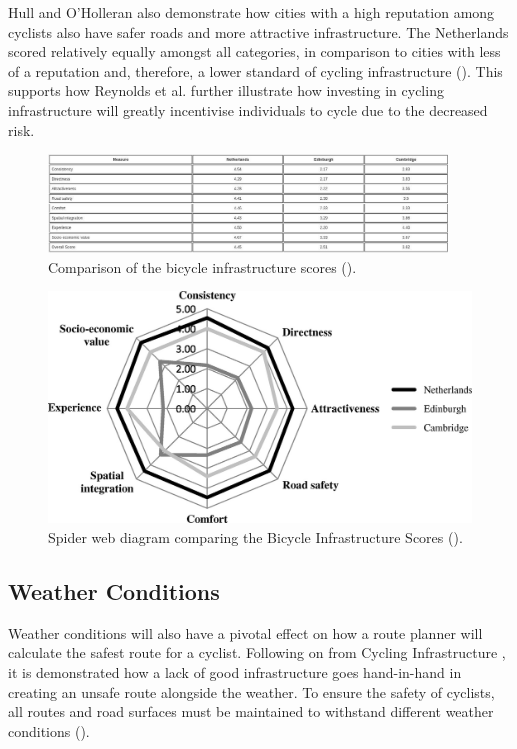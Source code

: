 Hull and O'Holleran also demonstrate how cities with a high reputation among cyclists also have safer roads and more attractive infrastructure. The Netherlands scored relatively equally amongst all categories, in comparison to cities with less of a reputation and, therefore, a lower standard of cycling infrastructure   (\cite{hull_bicycle_2014}). This supports how Reynolds et al. further illustrate how investing in cycling infrastructure will greatly incentivise individuals to cycle due to the decreased risk. 

\begin{figure}
    \centering
    \includegraphics[width=400px, keepaspectratio]{figures/bicycle_infrastructure_score_table.jpg}
    \caption{Comparison of the bicycle infrastructure scores (\cite{hull_bicycle_2014}).}
    \label{fig:bicycleinfrastructurescorestable}
\end{figure}

\begin{figure}
    \centering
    \includegraphics{figures/bicycle_infrastructure_scores.jpg}
    \caption{Spider web diagram comparing the Bicycle Infrastructure Scores (\cite{hull_bicycle_2014}).}
    \label{fig:bicycleinfrastructurescores}
\end{figure}

\subsection{Weather Conditions}
\label{litrev:weatherconditions}
Weather conditions will also have a pivotal effect on how a route planner will calculate the safest route for a cyclist. Following on from Cycling Infrastructure , it is demonstrated how a lack of good infrastructure goes hand-in-hand in creating an unsafe route alongside the weather. To ensure the safety of cyclists, all routes and road surfaces must be maintained to withstand different weather conditions (\cite{shoman_evaluation_2023}).

